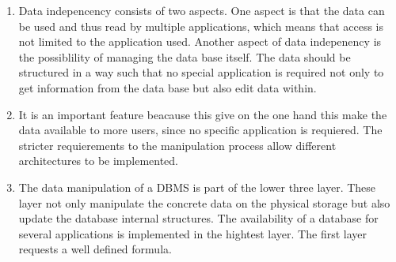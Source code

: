 \begin{exercise}{14}
\begin{subexercise}
\begin{tabular} { l | l }
    \end{tabular}
  \end{subexercise}
  \begin{subexercise}
    \begin{enumerate}
      \item Data indepencency consists of two aspects. One aspect is that the
            data can be used and thus read by multiple applications, which means
            that access is not limited to the application used.
            Another aspect of data indepenency is the possiblility of managing
            the data base itself. The data should be structured in a way such
            that no special application is required not only to get information
            from the data base but also edit data within.
      \item It is an important feature beacause this give on the one hand this
            make the data available to more users, since no specific application
            is requiered.
            The stricter requierements to the manipulation process allow
            different architectures to be implemented.
      \item The data manipulation of a DBMS is part of the lower three layer.
            These layer not only manipulate the concrete data on the physical
            storage but also update the database internal structures.
            The availability of a database for several applications is
            implemented in the hightest layer. The first layer requests a well
            defined formula.
    \end{enumerate}
  \end{subexercise}

\end{exercise}
